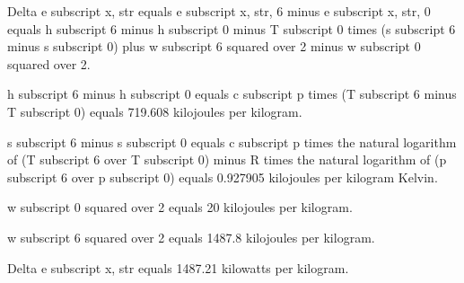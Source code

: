 Delta e subscript x, str equals e subscript x, str, 6 minus e subscript x, str, 0 equals h subscript 6 minus h subscript 0 minus T subscript 0 times (s subscript 6 minus s subscript 0) plus w subscript 6 squared over 2 minus w subscript 0 squared over 2.

h subscript 6 minus h subscript 0 equals c subscript p times (T subscript 6 minus T subscript 0) equals 719.608 kilojoules per kilogram.

s subscript 6 minus s subscript 0 equals c subscript p times the natural logarithm of (T subscript 6 over T subscript 0) minus R times the natural logarithm of (p subscript 6 over p subscript 0) equals 0.927905 kilojoules per kilogram Kelvin.

w subscript 0 squared over 2 equals 20 kilojoules per kilogram.

w subscript 6 squared over 2 equals 1487.8 kilojoules per kilogram.

Delta e subscript x, str equals 1487.21 kilowatts per kilogram.